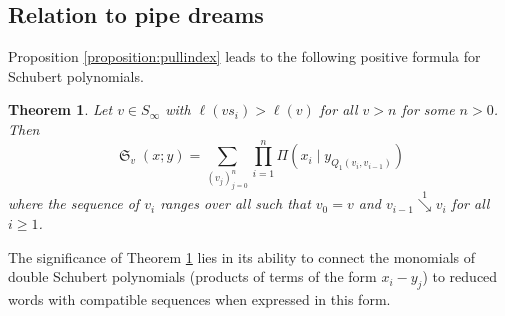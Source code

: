 \documentclass{amsart}
\newtheorem{theorem}{Theorem}[section]
\theoremstyle{definition}
\theoremstyle{remark}
\numberwithin{equation}{subsection}
\DeclareMathOperator{\sch}{\mathfrak{S}}
\newcommand{\smpfu}{\mathsf{\Pi}}
\newcommand{\smpre}[2]{\ensuremath{}\smpfu\left( #1 \mid #2\right)}
\newcommand{\downvar}[1]{\stackrel{#1}{\searrow}}
\begin{document}
\subsection{Relation to pipe dreams}

Proposition \ref{proposition:pullindex} leads to the following positive formula for Schubert polynomials.%

\begin{theorem} \label{theorem:schubformula}
	Let $v\in S_\infty$ with $\ell(vs_i)>\ell(v)$ for all $v>n$ for some $n>0$. Then
	$$\sch_v(x;y) = \sum_{(v_j)_{j=0}^n}\prod_{i=1}^n \smpre{x_{i}}{y_{Q_1(v_i,v_{i-1})}}$$
	where the sequence of $v_i$ ranges over all such that $v_0=v$ and $v_{i-1}\downvar{1}v_i$ for all $i\geq 1$.
\end{theorem}


The significance of Theorem \ref{theorem:schubformula} lies in its ability to connect the monomials of double Schubert polynomials (products of terms of the form $x_i-y_j$) to reduced words with compatible sequences when expressed in this form.
\end{document}
